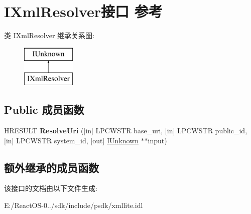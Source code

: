 \hypertarget{interface_i_xml_resolver}{}\section{I\+Xml\+Resolver接口 参考}
\label{interface_i_xml_resolver}
类 I\+Xml\+Resolver 继承关系图\+:\begin{figure}[H]
\begin{center}
\leavevmode
\includegraphics[height=2.000000cm]{interface_i_xml_resolver}
\end{center}
\end{figure}
\subsection*{Public 成员函数}
\begin{DoxyCompactItemize}
\item 
\mbox{\label{interface_i_xml_resolver_a36d15dff415b840b46dcfb97b444a2f5}} 
H\+R\+E\+S\+U\+LT {\bfseries Resolve\+Uri} (\mbox{[}in\mbox{]} L\+P\+C\+W\+S\+TR base\+\_\+uri, \mbox{[}in\mbox{]} L\+P\+C\+W\+S\+TR public\+\_\+id, \mbox{[}in\mbox{]} L\+P\+C\+W\+S\+TR system\+\_\+id, \mbox{[}out\mbox{]} \hyperlink{interface_i_unknown}{I\+Unknown} $\ast$$\ast$input)
\end{DoxyCompactItemize}
\subsection*{额外继承的成员函数}


该接口的文档由以下文件生成\+:\begin{DoxyCompactItemize}
\item 
E\+:/\+React\+O\+S-\/0../sdk/include/psdk/xmllite.\+idl\end{DoxyCompactItemize}
